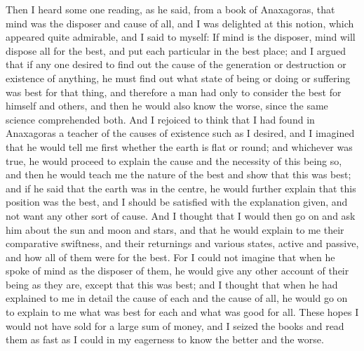 Then I heard some one reading, as he said, from a book of Anaxagoras, that
mind was the disposer and cause of all, and I was delighted at this
notion, which appeared quite admirable, and I said to myself: If mind is
the disposer, mind will dispose all for the best, and put each particular
in the best place; and I argued that if any one desired to find out the
cause of the generation or destruction or existence of anything, he must
find out what state of being or doing or suffering was best for that
thing, and therefore a man had only to consider the best for himself and
others, and then he would also know the worse, since the same science
comprehended both. And I rejoiced to think that I had found in Anaxagoras
a teacher of the causes of existence such as I desired, and I imagined
that he would tell me first whether the earth is flat or round; and
whichever was true, he would proceed to explain the cause and the
necessity of this being so, and then he would teach me the nature of the
best and show that this was best; and if he said that the earth was in the
centre, he would further explain that this position was the best, and I
should be satisfied with the explanation given, and not want any other
sort of cause. And I thought that I would then go on and ask him about the
sun and moon and stars, and that he would explain to me their comparative
swiftness, and their returnings and various states, active and passive,
and how all of them were for the best. For I could not imagine that when
he spoke of mind as the disposer of them, he would give any other account
of their being as they are, except that this was best; and I thought that
when he had explained to me in detail the cause of each and the cause of
all, he would go on to explain to me what was best for each and what was
good for all. These hopes I would not have sold for a large sum of money,
and I seized the books and read them as fast as I could in my eagerness to
know the better and the worse.

